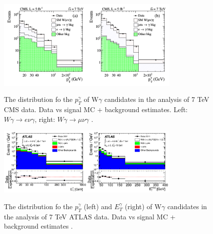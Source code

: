 
\begin{figure}[htb]
  \begin{center}
    {\includegraphics[width=0.80\textwidth]{../figs/WgAbout/Wg7TeV_CMS_ptGamma.png}}
    \caption{The distribution fo the $p_T^\gamma$ of W$\gamma$ candidates in the analysis of 7 TeV CMS data. Data vs signal MC + background estimates. Left: $W\gamma\rightarrow e\nu\gamma$, right: $W\gamma\rightarrow \mu\nu\gamma$ \cite{ref_7TeV_CMS}.}
    \label{fig:Wg7TeV_CMS_ptGamma}
  \end{center}
\end{figure}

\begin{figure}[htb]
  \begin{center}
    {\includegraphics[width=0.80\textwidth]{../figs/WgAbout/Wg7TeV_ATLAS_ptGamma.png}}
    \caption{The distribution fo the $p_T^\gamma$ (left) and $E_T^\gamma$ (right) of W$\gamma$ candidates in the analysis of 7 TeV ATLAS data. Data vs signal MC + background estimates \cite{ref_7TeV_ATLAS}. }
    \label{fig:Wg7TeV_ATLAS_ptGamma}
  \end{center}
\end{figure}


